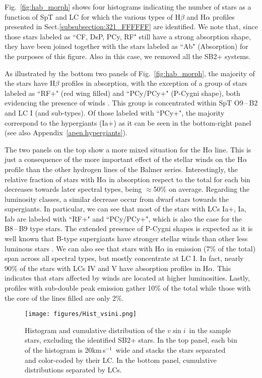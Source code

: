 \documentclass{aa}
\newcommand{\kms}{\mbox{km\,s$^{-1}$}}
\newcommand{\vsini}{\mbox{$v\sin i$}}
\begin{document}
Fig.~\ref{fig:hab_morph} shows four histograms indicating the number of stars as a function of SpT and LC for which the various types of H$\beta$ and H$\alpha$ profiles presented in Sect.\ref{subsubsection:321_FFFFFF} are identified. We note that, since those stars labeled as ``CF, DsP, PCy, RF" still have a strong absorption shape, they have been joined together with the stars labeled as ``Ab" (Absorption) for the purposes of this figure. Also in this case, we removed all the SB2+ systems.

As illustrated by the bottom two panels of Fig.~\ref{fig:hab_morph}, the majority of the stars have H$\beta$ profiles in absorption, with the exception of a group of stars labeled as ``RF+" (red wing filled) and ``PCy/PCy+" (P-Cygni shape), both evidencing the presence of winds \citep{1970ApJ...159..879L,1975ApJ...195..157C}. This group is concentrated within SpT O9\,--\,B2 and LC I (and sub-types). Of those labeled with ``PCy+", the majority correspond to the hypergiants (Ia+) as it can be seen in the bottom-right panel (see also Appendix~\ref{apen.hypergiants}).

The two panels on the top show a more mixed situation for the H$\alpha$ line. This is just a consequence of the more important effect of the stellar winds on the H$\alpha$ profile than the other hydrogen lines of the Balmer series. Interestingly, the relative fraction of stars with H$\alpha$ in absorption respect to the total for each bin decreases towards later spectral types, being $\approx$50\% on average. Regarding the luminosity classes, a similar decrease occur from dwarf stars towards the supergiants. In particular, we can see that most of the stars with LCs Ia+, Ia, Iab are labeled with ``RF+" and ``PCy/PCy+", which is also the case for the B8\,--\,B9 type stars. The extended presence of P-Cygni shapes is expected as it is well known that B-type supergiants have stronger stellar winds than other less luminous stars \citep{1999A&A...350..970K,2008A&A...478..823M}. We can also see that stars with H$\alpha$ in emission (7\% of the total) span across all spectral types, but mostly concentrate at LC I. In fact, nearly 90\% of the stars with LCs IV and V have absorption profiles in H$\alpha$. This indicates that stars affected by winds are located at higher luminosities. Lastly, profiles with sub-double peak emission gather 10\% of the total while those with the core of the lines filled are only 2\%.

\begin{figure}[!t]
\centering
\texttt{[image: figures/Hist\_vsini.png]}
\caption{Histogram and cumulative distribution of the \vsini\ in the sample stars, excluding the identified SB2+ stars. In the top panel, each bin of the histogram is 20\kms\ wide and stacks the stars separated and color-coded by their LC. In the bottom panel, cumulative distributions separated by LCs.} 
\label{fig:hist_vsini}
\end{figure}
\end{document}

